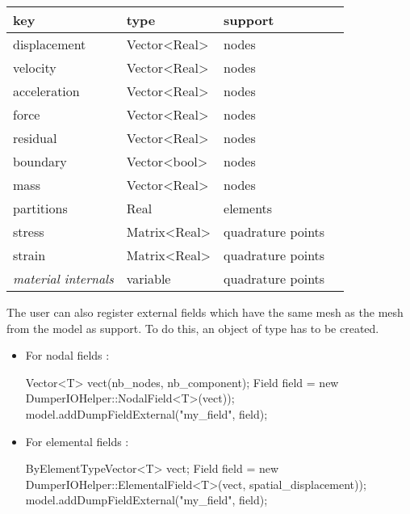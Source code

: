 \begin{tabular}{llll}
  \toprule
  key          &    type      & support \\
  \midrule
  displacement & Vector<Real> & nodes  \\
  velocity     & Vector<Real> & nodes  \\
  acceleration & Vector<Real> & nodes  \\
  force	       & Vector<Real> & nodes  \\
  residual     & Vector<Real> & nodes  \\
  boundary     & Vector<bool> & nodes  \\
  mass         & Vector<Real> & nodes  \\
  partitions   & Real         & elements \\
  stress & Matrix<Real> & quadrature points  \\
  strain & Matrix<Real> & quadrature points  \\
  \textit{material internals} & variable  & quadrature points  \\
\bottomrule
\end{tabular}


The user can also register external fields which have the same mesh as the mesh from the model as support. To do this, an object of type  has to be created.

\begin{itemize}
\item For nodal fields :
\begin{cpp}
  Vector<T> vect(nb_nodes, nb_component);
  Field field = new DumperIOHelper::NodalField<T>(vect));
  model.addDumpFieldExternal("my_field", field);
\end{cpp}

\item For elemental fields :
\begin{cpp}
  ByElementTypeVector<T> vect;
  Field field = new DumperIOHelper::ElementalField<T>(vect, spatial_displacement));
  model.addDumpFieldExternal("my_field", field);
\end{cpp}
\end{itemize}


